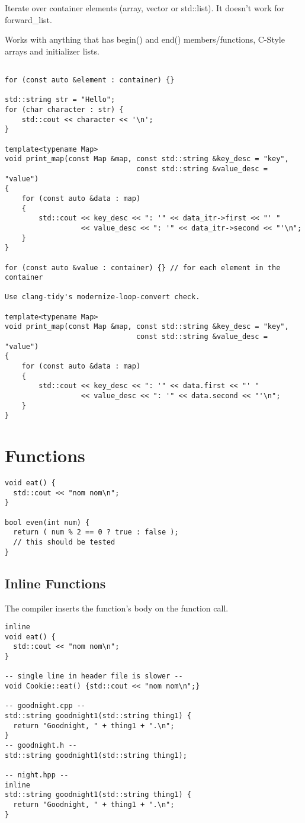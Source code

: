 \documentclass[openany]{report}
\begin{document}
Iterate over container elements (array, vector or std::list). It doesn't work for forward\_list.


Works with anything that has begin()
and end() members/functions, C-Style arrays and initializer lists.

\begin{verbatim}

for (const auto &element : container) {}

std::string str = "Hello";
for (char character : str) {
    std::cout << character << '\n';
}

template<typename Map>
void print_map(const Map &map, const std::string &key_desc = "key",
                               const std::string &value_desc = "value")
{
    for (const auto &data : map)
    {
        std::cout << key_desc << ": '" << data_itr->first << "' "
                  << value_desc << ": '" << data_itr->second << "'\n";
    }
}

for (const auto &value : container) {} // for each element in the container

Use clang-tidy's modernize-loop-convert check.

template<typename Map>
void print_map(const Map &map, const std::string &key_desc = "key",
                               const std::string &value_desc = "value")
{
    for (const auto &data : map)
    {
        std::cout << key_desc << ": '" << data.first << "' "
                  << value_desc << ": '" << data.second << "'\n";
    }
}
\end{verbatim}


\section{Functions}

\begin{verbatim}
void eat() {
  std::cout << "nom nom\n";
}

bool even(int num) {
  return ( num % 2 == 0 ? true : false );
  // this should be tested
}
\end{verbatim}

\subsection{Inline Functions}

The compiler inserts the function’s body on the function call.

\begin{verbatim}
inline 
void eat() {
  std::cout << "nom nom\n";
}

-- single line in header file is slower --
void Cookie::eat() {std::cout << "nom nom\n";}

-- goodnight.cpp --
std::string goodnight1(std::string thing1) {
  return "Goodnight, " + thing1 + ".\n";
}
-- goodnight.h --
std::string goodnight1(std::string thing1);

-- night.hpp -- 
inline
std::string goodnight1(std::string thing1) {
  return "Goodnight, " + thing1 + ".\n";
}
\end{verbatim}
\end{document}
